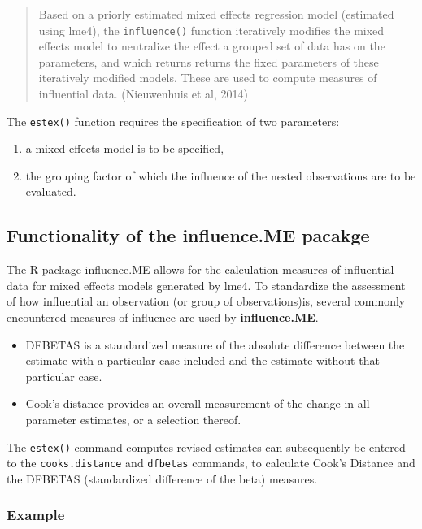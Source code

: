\documentclass[12pt, a4paper]{report}
\begin{document}
\begin{quote} Based on a priorly estimated
	mixed effects regression model (estimated using lme4), the \texttt{influence()} function iteratively modifies
	the mixed effects model to neutralize the effect a grouped set of data has on the parameters, and
	which returns returns the fixed parameters of these iteratively modified models. These are used to
	compute measures of influential data. (Nieuwenhuis et al, 2014)
\end{quote}



The \texttt{estex()} function requires the specification of two parameters: 
\begin{enumerate}
	\item a mixed effects model is to be specified,
	\item the grouping factor of which the influence of the nested observations are to be evaluated. 
\end{enumerate}


\subsection{Functionality of the influence.ME pacakge}
The R package influence.ME allows for the calculation measures of influential data for mixed effects models generated by lme4. To standardize the assessment of how influential an observation (or group of observations)is, several commonly encountered measures
of influence are used by \textbf{influence.ME}.


\begin{itemize}
	\item DFBETAS is a standardized measure of the absolute difference
	between the estimate with a particular case included and the estimate without that particular
	case. 
	\item Cook’s distance provides an overall measurement of the change in all parameter
	estimates, or a selection thereof.
\end{itemize}

The \texttt{estex()} command computes revised estimates can subsequently
be entered to the \texttt{cooks.distance} and \texttt{dfbetas} commands, to calculate Cook’s Distance
and the DFBETAS (standardized difference of the beta) measures.

\subsubsection*{Example}
\end{document}

